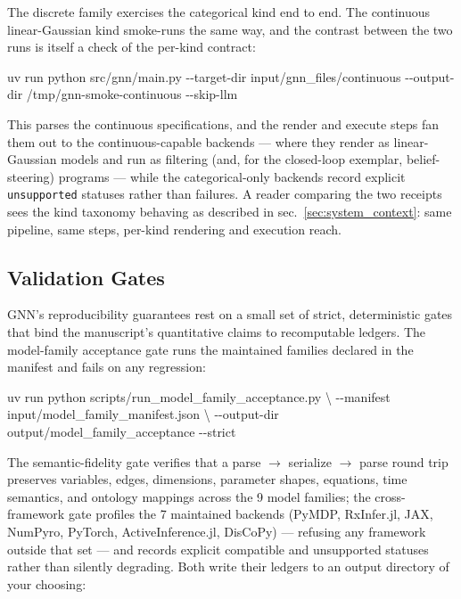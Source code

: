 \documentclass[
  english,
  9pt,
]{extarticle}
\newenvironment{Shaded}{}{}
\newcommand{\AttributeTok}[1]{\textcolor[rgb]{0.49,0.56,0.16}{#1}}
\newcommand{\DataTypeTok}[1]{\textcolor[rgb]{0.56,0.13,0.00}{#1}}
\newcommand{\ExtensionTok}[1]{#1}
\newcommand{\NormalTok}[1]{#1}
\begin{document}
The discrete family exercises the categorical kind end to end. The
continuous linear-Gaussian kind smoke-runs the same way, and the
contrast between the two runs is itself a check of the per-kind
contract:

\begin{Shaded}
\begin{Highlighting}[]
\ExtensionTok{uv}\NormalTok{ run python src/gnn/main.py }\AttributeTok{{-}{-}target{-}dir}\NormalTok{ input/gnn\_files/continuous }\AttributeTok{{-}{-}output{-}dir}\NormalTok{ /tmp/gnn{-}smoke{-}continuous }\AttributeTok{{-}{-}skip{-}llm}
\end{Highlighting}
\end{Shaded}

This parses the continuous specifications, and the render and execute
steps fan them out to the continuous-capable backends --- where they
render as linear-Gaussian models and run as filtering (and, for the
closed-loop exemplar, belief-steering) programs --- while the
categorical-only backends record explicit \texttt{unsupported} statuses
rather than failures. A reader comparing the two receipts sees the kind
taxonomy behaving as described in sec.~\ref{sec:system_context}: same
pipeline, same steps, per-kind rendering and execution reach.

\subsection{Validation Gates}\label{validation-gates}

GNN's reproducibility guarantees rest on a small set of strict,
deterministic gates that bind the manuscript's quantitative claims to
recomputable ledgers. The model-family acceptance gate runs the
maintained families declared in the manifest and fails on any
regression:

\begin{Shaded}
\begin{Highlighting}[]
\ExtensionTok{uv}\NormalTok{ run python scripts/run\_model\_family\_acceptance.py }\DataTypeTok{\textbackslash{}}
  \AttributeTok{{-}{-}manifest}\NormalTok{ input/model\_family\_manifest.json }\DataTypeTok{\textbackslash{}}
  \AttributeTok{{-}{-}output{-}dir}\NormalTok{ output/model\_family\_acceptance }\AttributeTok{{-}{-}strict}
\end{Highlighting}
\end{Shaded}

The semantic-fidelity gate verifies that a parse \texorpdfstring{\ensuremath{\to}}{->} serialize \texorpdfstring{\ensuremath{\to}}{->} parse
round trip preserves variables, edges, dimensions, parameter shapes,
equations, time semantics, and ontology mappings across the 9 model
families; the cross-framework gate profiles the 7 maintained backends
(PyMDP, RxInfer.jl, JAX, NumPyro, PyTorch, ActiveInference.jl, DisCoPy)
--- refusing any framework outside that set --- and records explicit
compatible and unsupported statuses rather than silently degrading. Both
write their ledgers to an output directory of your choosing:
\end{document}
